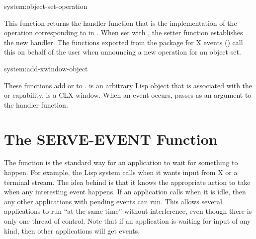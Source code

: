 \begin{defun}{system:}{object-set-operation}{%
    }
  
  This function returns the handler function that is the
  implementation of the operation corresponding to
   in .  When set with
  , the setter function establishes the new handler.  The
   functions exported from the
   package for X events ()
  call this on behalf of the user when announcing a new operation for
  an object set.
\end{defun}

\begin{defun}{system:}{add-xwindow-object}{%
    }
  
  These functions add  or  to .
   is an arbitrary Lisp object that is associated with the
   or  capability.   is a CLX
  window.  When an event occurs,  passes
   as an argument to the handler function.
\end{defun}


\section{The SERVE-EVENT Function}

The  function is the standard way for an application
to wait for something to happen.  For example, the Lisp system calls
 when it wants input from X or a terminal stream.
The idea behind  is that it knows the appropriate
action to take when any interesting event happens.  If an application calls
 when it is idle, then any other applications with
pending events can run.  This allows several applications to run ``at the
same time'' without interference, even though there is only one thread of
control.  Note that if an application is waiting for input of any kind,
then other applications will get events.

